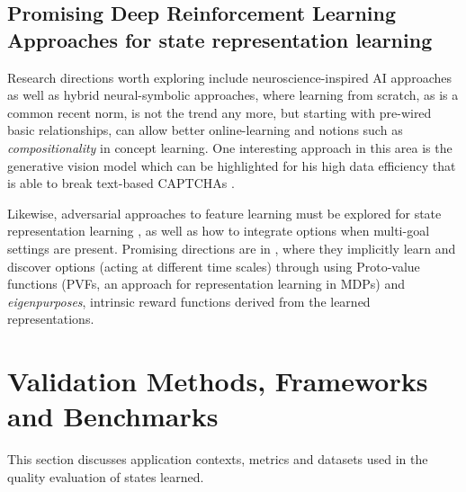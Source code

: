 \documentclass[a4paper]{article}
\begin{document}
\subsection{Promising Deep Reinforcement Learning Approaches for state representation learning}

Research directions worth exploring include neuroscience-inspired AI \cite{Hassabis17} approaches as well as hybrid neural-symbolic \cite{Garnelo16} approaches, where learning from scratch, as is a common recent norm, is not the trend any more, but starting with pre-wired basic relationships, can allow better online-learning and notions such as \textit{compositionality} in concept learning. One interesting approach in this area is the generative vision model which can be highlighted for his high data efficiency that is able to break text-based CAPTCHAs \cite{George17}. %

Likewise, adversarial approaches to feature learning must be explored for state representation learning \cite{Donahue16}, as well as how to integrate options when multi-goal settings are present. Promising directions are in \cite{Machado17a}, where they implicitly learn and discover options (acting at different time scales) through using Proto-value functions (PVFs, an approach for representation learning in MDPs) and \textit{eigenpurposes}, intrinsic reward functions derived from the learned representations. %

\section{Validation Methods, Frameworks and Benchmarks}
This section discusses application contexts, metrics and datasets used in the quality evaluation of states learned. 

\end{document}
